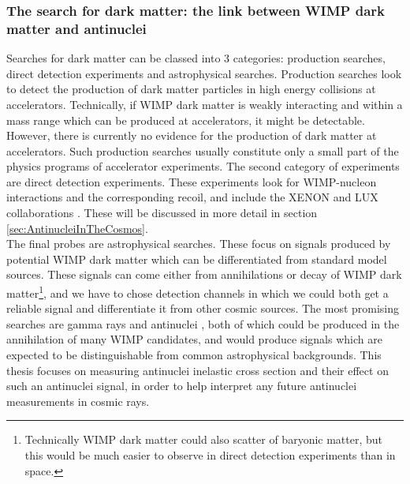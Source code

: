 \subsubsection{The search for dark matter: the link between WIMP dark matter and antinuclei}
Searches for dark matter can be classed into 3 categories: production searches, direct detection experiments and astrophysical searches. Production searches look to detect the production of dark matter particles in high energy collisions at accelerators. Technically, if WIMP dark matter is weakly interacting and within a mass range which can be produced at accelerators, it might be detectable. However, there is currently no evidence for the production of dark matter at accelerators. Such production searches usually constitute only a small part of the physics programs of accelerator experiments. The second category of experiments are direct detection experiments. These experiments look for WIMP-nucleon interactions and the corresponding recoil, and include the XENON \cite{XENON_new_physics, XENON2} and LUX collaborations \cite{Lux}. These will be discussed in more detail in section \ref{sec:AntinucleiInTheCosmos}.\\

The final probes are astrophysical searches. These focus on signals produced by potential WIMP dark matter which can be differentiated from standard model sources. These signals can come either from annihilations or decay of WIMP dark matter\footnote{Technically WIMP dark matter could also scatter of baryonic matter, but this would be much easier to observe in direct detection experiments than in space.}, and we have to chose detection channels in which we could both get a reliable signal and differentiate it from other cosmic sources. The most promising searches are gamma rays and antinuclei \cite{Conrad2017}, both of which could be produced in the annihilation of many WIMP candidates, and would produce signals which are expected to be distinguishable from common astrophysical backgrounds. This thesis focuses on measuring antinuclei inelastic cross section and their effect on such an antinuclei signal, in order to help interpret any future antinuclei measurements in cosmic rays.


%